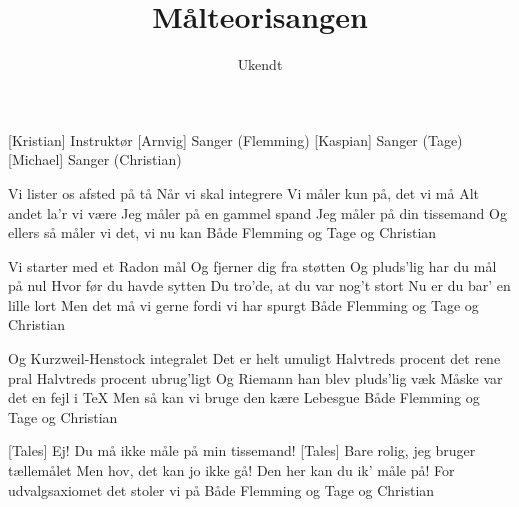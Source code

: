 \documentclass[a4paper,11pt]{article}
\title{Målteorisangen}
\author{Ukendt}
\begin{document}
\maketitle

\begin{roles}
[Kristian] Instruktør
[Arnvig] Sanger (Flemming)
[Kaspian] Sanger (Tage)
[Michael] Sanger (Christian)
\end{roles}

\begin{song}
 Vi lister os afsted på tå
Når vi skal integrere
Vi måler kun på, det vi må
Alt andet la'r vi være
 Jeg måler på en gammel spand
 Jeg måler på din tissemand
 Og ellers så måler vi det, vi nu kan
Både Flemming og Tage og Christian

 Vi starter med et Radon mål
Og fjerner dig fra støtten
Og pluds'lig har du mål på nul
Hvor før du havde sytten
Du tro'de, at du var nog't stort
Nu er du bar' en lille lort
Men det må vi gerne fordi vi har spurgt
Både Flemming og Tage og Christian

 Og Kurzweil-Henstock integralet
 Det er helt umuligt
Halvtreds procent det rene pral
Halvtreds procent ubrug'ligt
 Og Riemann han blev pluds'lig væk
 Måske var det en fejl i \TeX
{} Men så kan vi bruge den kære Lebesgue
Både Flemming og Tage og Christian

[Tales] Ej! Du må ikke måle på min tissemand!
[Tales] Bare rolig, jeg bruger tællemålet
 Men hov, det kan jo ikke gå!
Den her kan du ik' måle på!
 For udvalgsaxiomet det stoler vi på
Både Flemming og Tage og Christian
\end{song}
\end{document}
